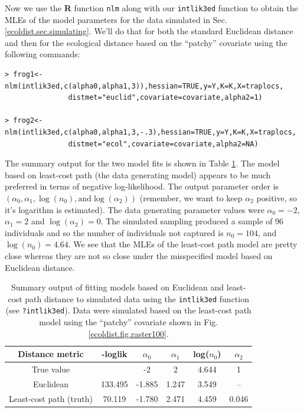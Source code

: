 Now we use the {\bf R} function \mbox{\tt nlm} along with
our \mbox{\tt intlik3ed} function to  obtain the MLEs of the
model parameters for the data simulated
in Sec. \ref{ecoldist.sec.simulating}.
 We'll do that for both the standard Euclidean distance
and then for the ecological distance based on the ``patchy''
covariate using the following commands:
{\small
 \begin{verbatim}
> frog1<-nlm(intlik3ed,c(alpha0,alpha1,3)),hessian=TRUE,y=Y,K=K,X=traplocs,
               distmet="euclid",covariate=covariate,alpha2=1)

> frog2<-nlm(intlik3ed,c(alpha0,alpha1,3,-.3),hessian=TRUE,y=Y,K=K,X=traplocs,
               distmet="ecol",covariate=covariate,alpha2=NA)
\end{verbatim}
}
The summary output for the two model fits is shown in Table \ref{ecoldist.tab.results1}.
The model based on least-cost path (the data generating model) appears
to be much preferred in terms of negative log-likelihood.
The output parameter order is $(\alpha_{0}, \alpha_{1}, \log(n_{0}), \text{and}
\log(\alpha_{2}))$ (remember, we want to keep $\alpha_{2}$
positive, so it's logarithm is estimated).
The data generating parameter values were
$\alpha_{0} = - 2$,
$\alpha_{1} = 2$ and $\log(\alpha_{2}) = 0$.
The simulated sampling produced a sample of 96 individuals and so the
number of individuals not captured is
$n_{0} = 104$, and $\log(n_{0}) = 4.64$. We see that the
 MLEs of the least-cost path model are pretty close whereas they are
 not so close under the misspecified model based on Euclidean distance.



\begin{table}
\caption{
Summary output of fitting models based on Euclidean and least-cost
path distance to simulated data using the
 \mbox{\tt intlik3ed} function (see \mbox{\tt ?intlik3ed}). Data were
 simulated based on the least-cost path model using the ``patchy''
 covariate shown in Fig. \ref{ecoldist.fig.raster100}.
}
\begin{tabular}{cccccc} \hline \hline
Distance metric &  -loglik &     $\alpha_0$  & $\alpha_1$  &\mbox{log}($n_{0}$) &  $\alpha_2$ \\ \hline
True value      &          &         -2      &    2       &   4.644 & 1 \\
Euclidean   &133.495&  -1.885 &    1.247 &    3.549 &      -- \\
Least-cost path (truth) & 70.119& -1.780 &  2.471    &    4.459 &
0.046  \\ \hline
\end{tabular}
\label{ecoldist.tab.results1}
\end{table}






